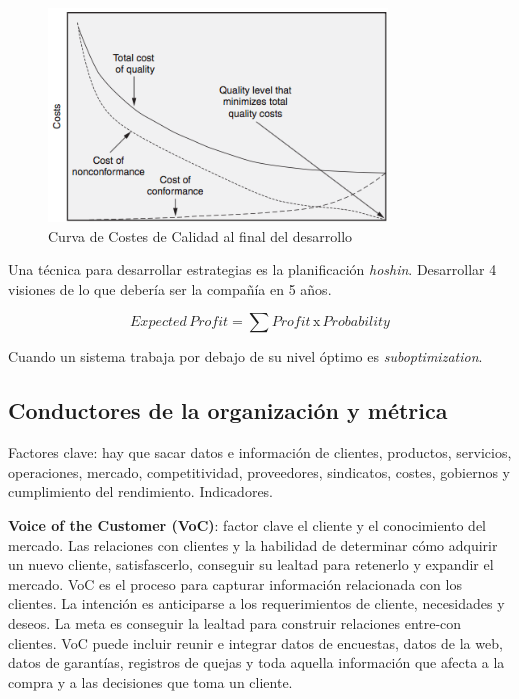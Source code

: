 \documentclass[]{article}
\begin{document}
\begin{figure}[ht!]
	\centering
	\includegraphics[width=90mm]{imagenes/CurvaCostesCalidadFin.png}
	\caption{Curva de Costes de Calidad al final del desarrollo}
	\label{fig:CurvaCostesdeCalidadFin}
\end{figure}

Una técnica para desarrollar estrategias es la planificación \textit{hoshin}. Desarrollar 4 visiones de lo que debería ser la compañía en 5 años.

\begin{equation}
Expected \, Profit  = \sum Profit \, \mathrm{x} \, Probability
\end{equation}

Cuando un sistema trabaja por debajo de su nivel óptimo es \textit{suboptimization}.

\subsection{Conductores de la organización y métrica}
Factores clave: hay que sacar datos e información de clientes, productos, servicios, operaciones, mercado, competitividad, proveedores, sindicatos, costes, gobiernos y cumplimiento del rendimiento. Indicadores.

\textbf{Voice of the Customer (VoC)}: factor clave el cliente y el conocimiento del mercado. Las relaciones con clientes y la habilidad de determinar cómo adquirir un nuevo cliente, satisfascerlo, conseguir su lealtad para retenerlo y expandir el mercado. VoC es el proceso para capturar información relacionada con los clientes. La intención es anticiparse a los requerimientos de cliente, necesidades y deseos. La meta es conseguir la lealtad para construir relaciones entre-con clientes. VoC puede incluir reunir e integrar datos de encuestas, datos de la web, datos de garantías, registros de quejas y toda aquella información que afecta a la compra y a las decisiones que toma un cliente.
\end{document}
